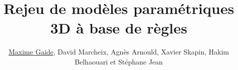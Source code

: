 \title[Rejeu de modèles paramétrique 3D à base de règles]{Rejeu de modèles paramétriques 3D à base de règles}%

\date{}%

\author[M. Gaide et al.]{\underline{Maxime Gaide}, David Marcheix, Agnès
  Arnould, Xavier Skapin, Hakim Belhaouari et Stéphane
  Jean}%

%

